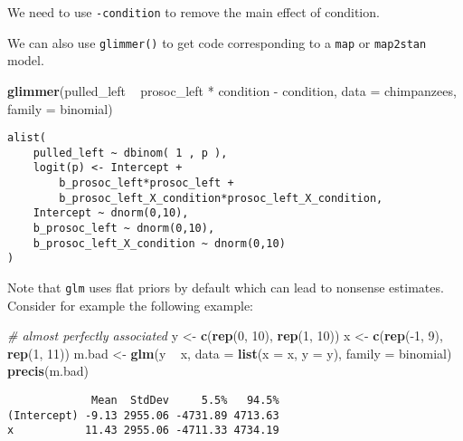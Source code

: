 \documentclass[]{tufte-handout}
\newenvironment{Shaded}{}{}
\newcommand{\KeywordTok}[1]{\textcolor[rgb]{0.00,0.44,0.13}{\textbf{#1}}}
\newcommand{\DataTypeTok}[1]{\textcolor[rgb]{0.56,0.13,0.00}{#1}}
\newcommand{\DecValTok}[1]{\textcolor[rgb]{0.25,0.63,0.44}{#1}}
\newcommand{\StringTok}[1]{\textcolor[rgb]{0.25,0.44,0.63}{#1}}
\newcommand{\CommentTok}[1]{\textcolor[rgb]{0.38,0.63,0.69}{\textit{#1}}}
\newcommand{\OperatorTok}[1]{\textcolor[rgb]{0.40,0.40,0.40}{#1}}
\newcommand{\NormalTok}[1]{#1}
\begin{document}
We need to use \texttt{-condition} to remove the main effect of
condition.

We can also use \texttt{glimmer()} to get code corresponding to a
\texttt{map} or \texttt{map2stan} model.

\begin{Shaded}
\begin{Highlighting}[]
\KeywordTok{glimmer}\NormalTok{(pulled_left }\OperatorTok{~}\StringTok{ }\NormalTok{prosoc_left }\OperatorTok{*}\StringTok{ }\NormalTok{condition }\OperatorTok{-}\StringTok{ }
\StringTok{    }\NormalTok{condition, }\DataTypeTok{data =}\NormalTok{ chimpanzees, }\DataTypeTok{family =}\NormalTok{ binomial)}
\end{Highlighting}
\end{Shaded}

\begin{verbatim}
alist(
    pulled_left ~ dbinom( 1 , p ),
    logit(p) <- Intercept +
        b_prosoc_left*prosoc_left +
        b_prosoc_left_X_condition*prosoc_left_X_condition,
    Intercept ~ dnorm(0,10),
    b_prosoc_left ~ dnorm(0,10),
    b_prosoc_left_X_condition ~ dnorm(0,10)
)
\end{verbatim}

Note that \texttt{glm} uses flat priors by default which can lead to
nonsense estimates. Consider for example the following example:

\begin{Shaded}
\begin{Highlighting}[]
\CommentTok{# almost perfectly associated}
\NormalTok{y <-}\StringTok{ }\KeywordTok{c}\NormalTok{(}\KeywordTok{rep}\NormalTok{(}\DecValTok{0}\NormalTok{, }\DecValTok{10}\NormalTok{), }\KeywordTok{rep}\NormalTok{(}\DecValTok{1}\NormalTok{, }\DecValTok{10}\NormalTok{))}
\NormalTok{x <-}\StringTok{ }\KeywordTok{c}\NormalTok{(}\KeywordTok{rep}\NormalTok{(}\OperatorTok{-}\DecValTok{1}\NormalTok{, }\DecValTok{9}\NormalTok{), }\KeywordTok{rep}\NormalTok{(}\DecValTok{1}\NormalTok{, }\DecValTok{11}\NormalTok{))}
\NormalTok{m.bad <-}\StringTok{ }\KeywordTok{glm}\NormalTok{(y }\OperatorTok{~}\StringTok{ }\NormalTok{x, }\DataTypeTok{data =} \KeywordTok{list}\NormalTok{(}\DataTypeTok{x =}\NormalTok{ x, }\DataTypeTok{y =}\NormalTok{ y), }
    \DataTypeTok{family =}\NormalTok{ binomial)}
\KeywordTok{precis}\NormalTok{(m.bad)}
\end{Highlighting}
\end{Shaded}

\begin{verbatim}
             Mean  StdDev     5.5%   94.5%
(Intercept) -9.13 2955.06 -4731.89 4713.63
x           11.43 2955.06 -4711.33 4734.19
\end{verbatim}
\end{document}
